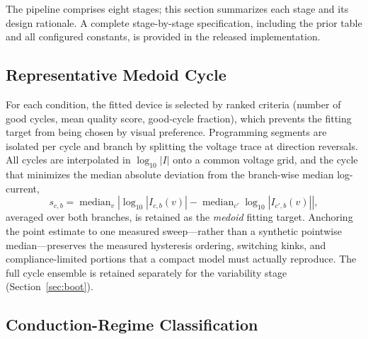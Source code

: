 \documentclass[journal]{IEEEtran}
\begin{document}
The pipeline comprises eight stages; this section summarizes each stage and
its design rationale.  A complete stage-by-stage specification, including the
prior table and all configured constants, is provided in the released
implementation.

\subsection{Representative Medoid Cycle}
\label{sec:medoid}

For each condition, the fitted device is selected by ranked criteria (number
of good cycles, mean quality score, good-cycle fraction), which prevents the
fitting target from being chosen by visual preference.  Programming segments
are isolated per cycle and branch by splitting the voltage trace at direction
reversals.  All cycles are interpolated in $\log_{10}|I|$ onto a common
voltage grid, and the cycle that minimizes the median absolute deviation
from the branch-wise median log-current,
\begin{equation}
  s_{c,b} =
  \operatorname{median}_{v}\left|
  \log_{10}|I_{c,b}(v)| -
  \operatorname{median}_{c'}\log_{10}|I_{c',b}(v)|
  \right|,
  \label{eq:medoid-score}
\end{equation}
averaged over both branches, is retained as the \emph{medoid} fitting target.
Anchoring the point estimate to one measured sweep---rather than a synthetic
pointwise median---preserves the measured hysteresis ordering, switching
kinks, and compliance-limited portions that a compact model must actually
reproduce.  The full cycle ensemble is retained separately for the
variability stage (Section~\ref{sec:boot}).

\subsection{Conduction-Regime Classification}
\label{sec:regimes}
\end{document}
